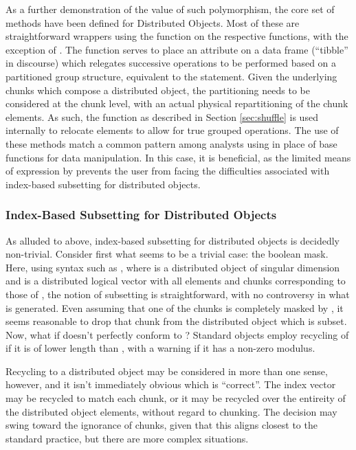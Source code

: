 As a further demonstration of the value of such polymorphism, the core set of  methods have been defined for Distributed Objects.
Most of these are straightforward wrappers using the  function on the respective  functions, with the exception of .
The  function serves to place an attribute on a data frame (``tibble'' in  discourse) which relegates successive operations to be performed based on a partitioned group structure, equivalent to the   statement.
Given the underlying chunks which compose a distributed object, the partitioning needs to be considered at the chunk level, with an actual physical repartitioning of the chunk elements.
As such, the  function as described in Section \ref{sec:shuffle} is used internally to relocate elements to allow for true grouped operations.
The use of these methods match a common pattern among analysts using  in place of base \R functions for data manipulation.
In this case, it is beneficial, as the limited means of expression by  prevents the user from facing the difficulties associated with index-based subsetting for distributed objects.

\subsubsection{Index-Based Subsetting for Distributed Objects}

As alluded to above, index-based subsetting for distributed objects is decidedly non-trivial.
Consider first what seems to be a trivial case: the boolean mask.
Here, using syntax such as , where  is a distributed object of singular dimension and  is a distributed logical vector with all elements and chunks corresponding to those of , the notion of subsetting is straightforward, with no controversy in what is generated.
Even assuming that one of the chunks is completely masked by , it seems reasonable to drop that chunk from the distributed object which is subset.
Now, what if  doesn't perfectly conform to ?
Standard \R objects employ recycling of  if it is of lower length than , with a warning if it has a non-zero modulus.

Recycling to a distributed object may be considered in more than one sense, however, and it isn't immediately obvious which is ``correct''.
The index vector may be recycled to match each chunk, or it may be recycled over the entireity of the distributed object elements, without regard to chunking.
The decision may swing toward the ignorance of chunks, given that this aligns closest to the standard \R practice, but there are more complex situations.

